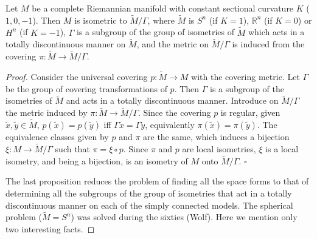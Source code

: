 \begin{proposition}
  \label{prop:dc-ch8-4-3}
  Let $M$ be a complete Riemannian manifold with constant sectional curvature $K$
  ($1,0,-1$). Then $M$ is isometric to $\tilde{M}/\Gamma$, where $\tilde{M}$ is $S^n$
  (if $K=1$), $\mathbb{R}^n$ (if $K=0$) or $H^n$ (if $K=-1$), $\Gamma$ is a subgroup
  of the group of isometries of $\tilde{M}$ which acts in a totally discontinuous
  manner on $\tilde{M}$, and the metric on $\tilde{M}/\Gamma$ is induced from the
  covering $\pi:\tilde{M}\to\tilde{M}/\Gamma$.
\end{proposition}
\begin{proof}
  Consider the universal covering $p:\tilde{M}\to M$ with the covering
  metric. Let $\Gamma$ be the group of covering transformations of $p$. Then
  $\Gamma$ is a subgroup of the isometries of $\tilde{M}$ and acts in a totally
  discontinuous manner. Introduce on $\tilde{M}/\Gamma$ the metric induced by
  $\pi:\tilde{M}\to\tilde{M}/\Gamma$. Since the covering $p$ is regular, given
  $\tilde{x},\tilde{y}\in\tilde{M}$, $p(\tilde{x})=p(\tilde{y})$ iff
  $\Gamma\tilde{x}=\Gamma\tilde{y}$, equivalently $\pi(\tilde{x})=\pi(\tilde{y})$.
  The equivalence classes given by $p$ and $\pi$ are the same, which induces a
  bijection $\xi:M\to\tilde{M}/\Gamma$ such that $\pi=\xi\circ p$. Since $\pi$ and
  $p$ are local isometries, $\xi$ is a local isometry, and being a bijection, is an
  isometry of $M$ onto $\tilde{M}/\Gamma$. $\square$
  
  The last proposition reduces the problem of finding all the space forms to that of
  determining all the subgroups of the group of isometries that act in a totally
  discontinuous manner on each of the simply connected models. The spherical problem
  ($\tilde{M}=S^n$) was solved during the sixties (Wolf). Here we mention only two
  interesting facts.
\end{proof}

